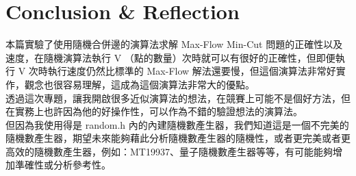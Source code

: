 \documentclass[12pt]{article}
\begin{document}
	\part{Conclusion \& Reflection}	
	本篇實驗了使用隨機合併邊的演算法求解 Max-Flow Min-Cut 問題的正確性以及速度，在隨機演算法執行 V （點的數量）次時就可以有很好的正確性，但即便執行 V 次時執行速度仍然比標準的 Max-Flow 解法還要慢，但這個演算法非常好實作，觀念也很容易理解，這成為這個演算法非常大的優點。 \\
	
	透過這次專題，讓我開啟很多近似演算法的想法，在競賽上可能不是個好方法，但在實務上也許因為他的好操作性，可以作為不錯的驗證想法的演算法。\\
	
	但因為我使用得是 random.h 內的內建隨機數產生器，我們知道這是一個不完美的隨機數產生器，期望未來能夠藉此分析隨機數產生器的隨機性，或者更完美或者更高效的隨機數產生器，例如：MT19937、量子隨機數產生器等等，有可能能夠增加準確性或分析參考性。
\end{document}
